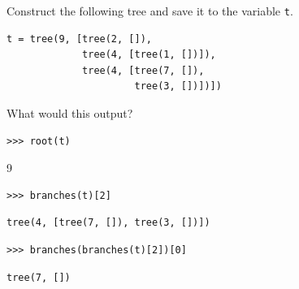 \documentclass{exam}
\begin{document}
\begin{questions}
\begin{blocksection}
\end{blocksection}

\begin{blocksection}
\question Construct the following tree and save it to the variable \texttt{t}.


\begin{solution}[4in]
\begin{lstlisting}
t = tree(9, [tree(2, []),
             tree(4, [tree(1, [])]),
             tree(4, [tree(7, []),
                      tree(3, [])])])
\end{lstlisting}
\end{solution}

\end{blocksection}

\begin{blocksection}
\question What would this output?

\begin{lstlisting}
>>> root(t)
\end{lstlisting}
\begin{solution}[.25in]
9
\end{solution}

\begin{lstlisting}
>>> branches(t)[2]
\end{lstlisting}
\begin{solution}[.25in]
\begin{lstlisting}
tree(4, [tree(7, []), tree(3, [])])
\end{lstlisting}
\end{solution}

\begin{lstlisting}
>>> branches(branches(t)[2])[0]
\end{lstlisting}
\begin{solution}[.25in]
\begin{lstlisting}
tree(7, [])
\end{lstlisting}
\end{solution}
\end{blocksection}


\end{questions}
\end{document}
